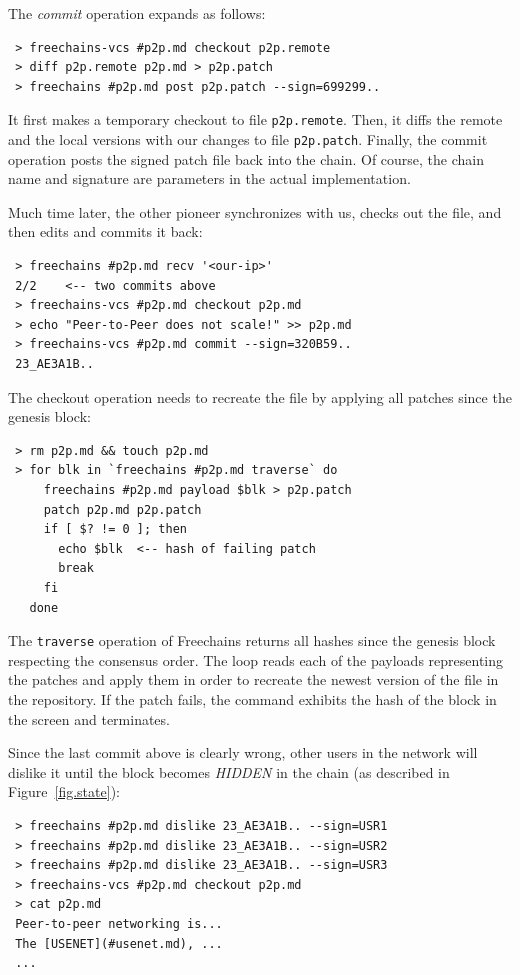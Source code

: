 \documentclass[10pt,journal,compsoc]{IEEEtran}
\newcommand{\FC}       {Freechains\xspace}
\begin{document}
The \emph{commit} operation expands as follows:

{\footnotesize
\begin{verbatim}
 > freechains-vcs #p2p.md checkout p2p.remote
 > diff p2p.remote p2p.md > p2p.patch
 > freechains #p2p.md post p2p.patch --sign=699299..
\end{verbatim}
}

It first makes a temporary checkout to file \texttt{p2p.remote}.
Then, it diffs the remote and the local versions with our changes to file
\texttt{p2p.patch}.
Finally, the commit operation posts the signed patch file back into the chain.
Of course, the chain name and signature are parameters in the actual
implementation.

Much time later, the other pioneer synchronizes with us, checks out the file,
and then edits and commits it back:

{\footnotesize
\begin{verbatim}
 > freechains #p2p.md recv '<our-ip>'
 2/2    <-- two commits above
 > freechains-vcs #p2p.md checkout p2p.md
 > echo "Peer-to-Peer does not scale!" >> p2p.md
 > freechains-vcs #p2p.md commit --sign=320B59..
 23_AE3A1B..
\end{verbatim}
}

The checkout operation needs to recreate the file by applying all patches since
the genesis block:

{\footnotesize
\begin{verbatim}
 > rm p2p.md && touch p2p.md
 > for blk in `freechains #p2p.md traverse` do
     freechains #p2p.md payload $blk > p2p.patch
     patch p2p.md p2p.patch
     if [ $? != 0 ]; then
       echo $blk  <-- hash of failing patch
       break
     fi
   done
\end{verbatim}
}

The \texttt{traverse} operation of \FC returns all hashes since the genesis
block respecting the consensus order.
The loop reads each of the payloads representing the patches and apply them in
order to recreate the newest version of the file in the repository.
If the patch fails, the command exhibits the hash of the block in the screen
and terminates.

Since the last commit above is clearly wrong, other users in the network will
dislike it until the block becomes \emph{HIDDEN} in the chain (as described in
Figure~\ref{fig.state}):

{\footnotesize
\begin{verbatim}
 > freechains #p2p.md dislike 23_AE3A1B.. --sign=USR1
 > freechains #p2p.md dislike 23_AE3A1B.. --sign=USR2
 > freechains #p2p.md dislike 23_AE3A1B.. --sign=USR3
 > freechains-vcs #p2p.md checkout p2p.md
 > cat p2p.md
 Peer-to-peer networking is...
 The [USENET](#usenet.md), ...
 ...
\end{verbatim}
}
\end{document}

